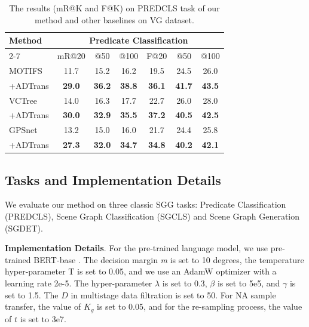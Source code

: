 \documentclass[letterpaper]{article} %
\begin{document}
\begin{table}[]
\tabcolsep=0.1cm

\begin{tabular}{l|cccccc}
\hline
\multirow{2}{*}{Method} & \multicolumn{6}{c}{Predicate Classification}                                                                      \\ \cline{2-7} 
                        & mR@20         & @50         & \multicolumn{1}{c|}{@100}        & F@20          & @50          & @100         \\ \hline
MOTIFS                  & 11.7          & 15.2          & \multicolumn{1}{c|}{16.2}          & 19.5          & 24.5          & 26.0          \\
\quad+ADTrans                & \textbf{29.0} & \textbf{36.2} & \multicolumn{1}{c|}{\textbf{38.8}} & \textbf{36.1} & \textbf{41.7} & \textbf{43.5} \\ \hline
VCTree                  & 14.0          & 16.3          & \multicolumn{1}{c|}{17.7}          & 22.7          & 26.0          & 28.0          \\
\quad+ADTrans                & \textbf{30.0} & \textbf{32.9} & \multicolumn{1}{c|}{\textbf{35.5}} & \textbf{37.2} & \textbf{40.5} & \textbf{42.5} \\ \hline
GPSnet                  & 13.2          & 15.0          & \multicolumn{1}{c|}{16.0}          & 21.7          & 24.4          & 25.8          \\
\quad+ADTrans                & \textbf{27.3} & \textbf{32.0} & \multicolumn{1}{c|}{\textbf{34.7}} & \textbf{34.8} & \textbf{40.2} & \textbf{42.1} \\ \hline
\end{tabular}
\caption{The results (mR@K and F@K) on PREDCLS task of our method and other baselines on VG dataset.}
\label{predcls}
\end{table}


\subsection{Tasks and Implementation Details}

 We evaluate our method on three classic SGG tasks: Predicate Classification (PREDCLS), Scene Graph Classification (SGCLS) and Scene Graph Generation (SGDET).

\noindent\textbf{Implementation Details}. For the pre-trained language model, we use pre-trained {BERT-base} \cite{devlin-etal-2019-bert}. The decision margin \textit{m} is set to 10 degrees, the temperature hyper-parameter T is set to 0.05, and we use an AdamW \cite{Loshchilov} optimizer with a learning rate 2e-5. The hyper-parameter $ \lambda $ is set to 0.3, $ \beta $ is set to 5e5, and $ \gamma $ is set to 1.5.  The $ D $ in multistage data filtration is set to 50. For NA sample transfer, the value of $K_g$ is set to 0.05, and for the re-sampling process, the value of $t$ is set to 3e7.
\end{document}
